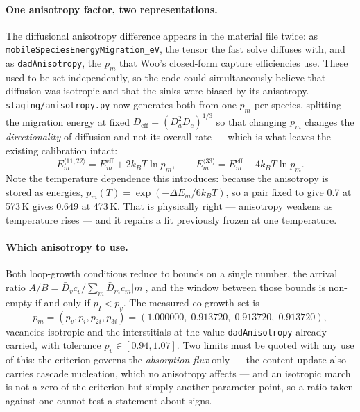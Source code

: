 \documentclass[11pt]{article}
\newcommand{\code}[1]{\texttt{\small #1}}
\newcommand{\file}[1]{\texttt{\footnotesize #1}}
\begin{document}
\paragraph{One anisotropy factor, two representations.}
The diffusional anisotropy difference appears in the material file twice: as
\code{mobileSpeciesEnergyMigration\_eV}, the tensor the fast solve diffuses
with, and as \code{dadAnisotropy}, the $p_m$ that Woo's closed-form capture
efficiencies use. These used to be set independently, so the code could
simultaneously believe that diffusion was isotropic and that the sinks were
biased by its anisotropy. \file{staging/anisotropy.py} now generates both from
one $p_m$ per species, splitting the migration energy at fixed
$D_{\text{eff}}=(D_a^2 D_c)^{1/3}$ so that changing $p_m$ changes the
\emph{directionality} of diffusion and not its overall rate --- which is what
leaves the existing calibration intact:
\begin{equation}
E_m^{\langle 11,22\rangle}=E_m^{\text{eff}}+2k_BT\ln p_m,
\qquad
E_m^{\langle 33\rangle}=E_m^{\text{eff}}-4k_BT\ln p_m .
\end{equation}
Note the temperature dependence this introduces: because the anisotropy is
stored as energies, $p_m(T)=\exp(-\Delta E_m/6k_BT)$, so a pair fixed to give
0.7 at 573\,K gives 0.649 at 473\,K. That is physically right --- anisotropy
weakens as temperature rises --- and it repairs a fit previously frozen at one
temperature.

\paragraph{Which anisotropy to use.} Both loop-growth conditions reduce to
bounds on a single number, the arrival ratio
$A/B=\bar D_v c_v / \sum_m \bar D_m c_m |m|$, and the window between those
bounds is non-empty if and only if $p_I<p_v$. The measured co-growth set is
\begin{equation}
p_m=(p_v,p_i,p_{2i},p_{3i}) = (1.000000,\;0.913720,\;0.913720,\;0.913720),
\end{equation}
vacancies isotropic and the interstitials at the value \code{dadAnisotropy}
already carried, with tolerance $p_v\in[0.94,1.07]$. Two limits must be quoted
with any use of this: the criterion governs the \emph{absorption flux} only ---
the content update also carries cascade nucleation, which no anisotropy
affects --- and an isotropic march is not a zero of the criterion but simply
another parameter point, so a ratio taken against one cannot test a statement
about signs.
\end{document}
